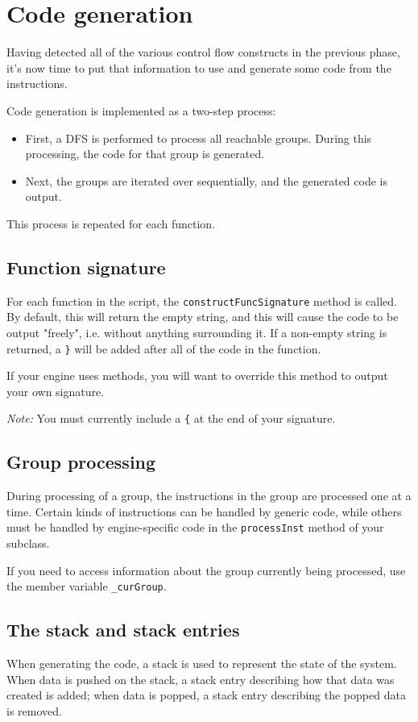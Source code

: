\section{Code generation}
\label{sec:codegen}

Having detected all of the various control flow constructs in the previous phase, it's now time to put that information to use and generate some code from the instructions.

Code generation is implemented as a two-step process:
\begin{itemize}
\item First, a DFS is performed to process all reachable groups. During this processing, the code for that group is generated.
\item Next, the groups are iterated over sequentially, and the generated code is output.
\end{itemize}

This process is repeated for each function.

\subsection{Function signature}
For each function in the script, the \verb+constructFuncSignature+ method is called. By default, this will return the empty string, and this will cause the code to be output "freely", i.e. without anything surrounding it. If a non-empty string is returned, a \verb+}+ will be added after all of the code in the function.

If your engine uses methods, you will want to override this method to output your own signature.

\emph{Note:} You must currently include a \verb+{+ at the end of your signature.

\subsection{Group processing}
During processing of a group, the instructions in the group are processed one at a time. Certain kinds of instructions can be handled by generic code, while others must be handled by engine-specific code in the \verb+processInst+ method of your subclass.

If you need to access information about the group currently being processed, use the member variable \verb+_curGroup+.

\subsection{The stack and stack entries}
When generating the code, a stack is used to represent the state of the system. When data is pushed on the stack, a stack entry describing how that data was created is added; when data is popped, a stack entry describing the popped data is removed.

